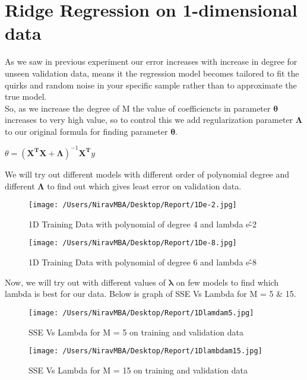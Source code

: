 \documentclass[12pt]{report}
\begin{document}
\section{Ridge Regression on 1-dimensional data}

As we saw in previous experiment our error increases with increase in degree for unseen validation data, means it the regression model becomes tailored to fit the quirks and random noise in your specific sample rather than to approximate the true model.\\
 So, as we increase the degree of M the value of coefficiencts in parameter $ \mathbf{\theta} $ increases to very high value, so to control this we add regularization parameter $ \mathbf{\Lambda} $ to our original formula for finding parameter $ \mathbf{\theta} $.

\begin{center}
	$ {\displaystyle { {\theta }=(\mathbf {X} ^{\mathbf {T}}\mathbf {X} + \mathbf{\Lambda} )^{-1} \mathbf {X} ^{\mathbf {T}} {y}}} $
\end{center}

We will try out different models with different order of polynomial degree and different  $ \mathbf{\Lambda} $ to find out which gives least error on validation data.

\begin{figure}[H]
	\centering
	\texttt{[image: /Users/NiravMBA/Desktop/Report/1De-2.jpg]}
	\caption{1D Training Data with polynomial of degree 4 and lambda e\^-2} 
\end{figure}

\begin{figure}[H]
	\centering
	\texttt{[image: /Users/NiravMBA/Desktop/Report/1De-8.jpg]}
	\caption{1D Training Data with polynomial of degree 6 and lambda e\^-8} 
\end{figure}



Now, we will try out with different values of $ \mathbf{\lambda} $ on few models to find which lambda is best for our data. Below is graph of SSE Vs Lambda for M = 5 \& 15.

\begin{figure}[H]
	\centering
	\texttt{[image: /Users/NiravMBA/Desktop/Report/1Dlamdam5.jpg]}
	\caption{SSE Vs Lambda for M = 5 on  training and validation data} 
\end{figure}


\begin{figure}[H]
	\centering
	\texttt{[image: /Users/NiravMBA/Desktop/Report/1Dlambdam15.jpg]}
	\caption{SSE Vs Lambda for M = 15 on  training and validation data} 
\end{figure}
\end{document}
